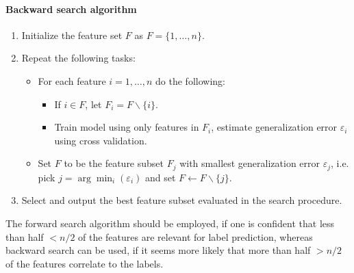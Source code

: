 \documentclass[a4paper,11pt]{article}
\numberwithin{equation}{section}
\begin{document}
{\paragraph*{Backward search algorithm}
\begin{enumerate}
	\item Initialize the feature set $F$ as $F= \{1,\dots,n\}$.
	\item Repeat the following tasks:
	\begin{itemize}
		\item[] For each feature $i = 1,\dots,n$ do the following:
		\begin{itemize}
			\item[] If $i \in F$, let $F_i = F\backslash \{i\}$. 
			\item[] Train model using only features in $F_i$, estimate generalization error $\varepsilon_i$ using cross validation.
		\end{itemize} 
		\item[] Set $F$ to be the feature subset $F_j$ with smallest generalization error $\varepsilon_j$, i.e. pick $j = \arg\min_i(\varepsilon_i)$ and set $F \leftarrow F \backslash \{j\}$.
	\end{itemize}
	\item Select and output the best feature subset evaluated in the search procedure.
\end{enumerate} 

The forward search algorithm should be employed, if one is confident that less than half $< n/2$ of the features are relevant for label prediction, whereas backward search can be used, if it seems more likely that more than half $>n/2$ of the features correlate to the labels.%
}
\end{document}
